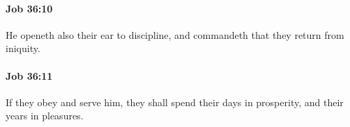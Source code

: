 		\paragraph{Job 36:10} %
			\label{JOB-36-10}

			He openeth also their ear to discipline, and commandeth that they return from iniquity.


		\paragraph{Job 36:11} %
			\label{JOB-36-11}

			If they obey and serve him, they shall spend their days in prosperity, and their years in pleasures.


